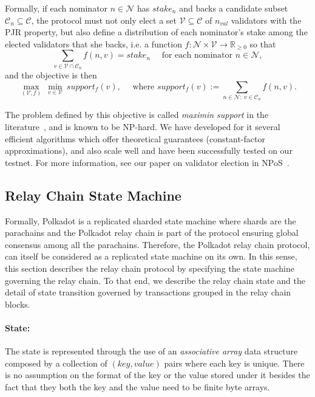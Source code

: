 \documentclass{article}
\newcommand{\Nom}{\ensuremath{\mathcal{N}}} %
\newcommand{\Val}{\ensuremath{\mathcal{V}}} %
\newcommand{\nval}{\ensuremath{n_{val}}} %
\newcommand{\Can}{\ensuremath{\mathcal{C}}} %
\newcommand{\nom}{\ensuremath{n}} %
\newcommand{\val}{\ensuremath{v}} %
\begin{document}
Formally, if each nominator $\nom \in \Nom$ has $stake_\nom$ and backs a candidate subset $\Can_\nom\subseteq \Can$,
the protocol must not only elect a set $\Val\subseteq \Can$ of $\nval$ validators
with the PJR property, but also define a distribution of each nominator's stake among the elected validators that she backs,
i.e. a function $f:\Nom\times\Val \rightarrow \mathbb{R}_{\geq 0}$ so that
$$\sum_{\val\in \Val\cap \Can_\nom} f(\nom, \val) = stake_\nom \quad \text{ for each nominator } \nom\in\Nom,$$
and the objective is then
$$\max_{(\Val, f)} \: \min_{\val\in \Val} \: support_f(\val),
\quad \text{ where } support_f(\val) := \sum_{\nom\in \Nom: \ \val\in \Can_\nom} f(\nom, \val). $$

The problem defined by this objective is called \emph{maximin support} in the literature~\cite{sanchez2016maximin}, and is known to be NP-hard.
We have developed for it several efficient algorithms which offer theoretical guarantees 
(constant-factor approximations), and also scale well and have been successfully tested on our testnet. 
For more information, see our paper on validator election in NPoS~\cite{NPoSpaper}.


\subsection{Relay Chain State Machine}\label{sec:relaychain}

Formally, Polkadot is a replicated sharded state machine where shards are the parachains and the Polkadot relay chain is part of the protocol ensuring global consensus among all the parachains. Therefore, the Polkadot relay chain protocol, can itself be considered as a replicated state machine on its own. In this sense, this section describes the relay chain protocol by specifying the state machine governing the relay chain. To that end, we describe the relay chain state and the detail of state transition governed by transactions grouped in the relay chain blocks.

\paragraph{State:} The state is represented through the use of an \emph{associative array} data structure composed by a collection of $(key, value)$ pairs where each key is unique. There is no assumption on the format of the key or the value stored under it besides the fact that they both the key and the value need to be finite byte arrays.
\end{document}
